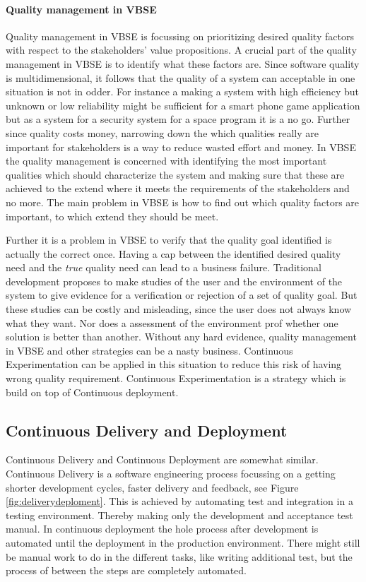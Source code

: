 \documentclass{sig-alternate}
\begin{document}
\paragraph{Quality management in VBSE}
Quality management in VBSE is focussing on prioritizing desired quality factors with respect to the stakeholders' value propositions. A crucial part of the quality management in VBSE is to identify what these factors are. Since software quality is multidimensional, it follows that the quality of a system can acceptable in one situation is not in odder. For instance a making a system with high efficiency but unknown or low reliability might be sufficient for a smart phone game application but as a system for a security system for a space program it is a no go. Further since quality costs money, narrowing down the which qualities really are important for stakeholders is a way to reduce wasted effort and money. In VBSE the quality management is concerned with identifying the most important qualities which should characterize the system and making sure that these are achieved to the extend where it meets the requirements of the stakeholders and no more. 
The main problem in VBSE is how to find out which quality factors are important, to which extend they should be meet. 

Further it is a problem in VBSE to verify that the quality goal identified is actually the correct once. Having a cap between the identified desired quality need and the \textit{true} quality need can lead to a business failure. 
Traditional development proposes to make studies of the user and the environment of the system to give evidence for a verification or rejection of a set of quality goal. But these studies can be costly and misleading, since the user does not always know what they want. Nor does a assessment of the environment prof whether one solution is better than another. Without any hard evidence, quality management in VBSE and other strategies can be a nasty business. Continuous Experimentation can be applied in this situation to reduce this risk of having wrong quality requirement. 
Continuous Experimentation is a strategy which is build on top of Continuous deployment.  

\subsection{Continuous Delivery and Deployment}
Continuous Delivery and Continuous Deployment are somewhat similar.
Continuous Delivery is a software engineering process focussing on a getting shorter development cycles, faster delivery and feedback, see Figure \ref{fig:deliverydeploment}. This is achieved by automating test and integration in a testing environment. Thereby making only the development and acceptance test manual. In continuous deployment the hole process after development is automated until the deployment in the production environment. There might still be manual work to do in the different tasks, like writing additional test, but the process of between the steps are completely automated.  
\end{document}
